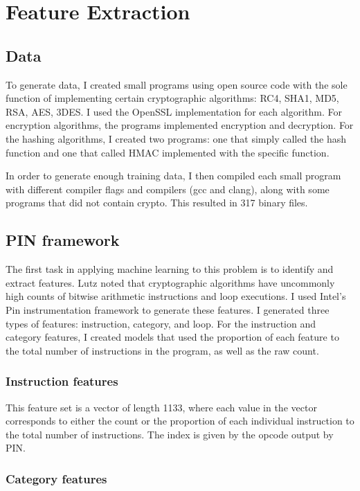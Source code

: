 \chapter{Feature Extraction}

\section{Data}
To generate data, I created small programs using open source code with the sole function of implementing certain cryptographic algorithms: RC4, SHA1, MD5, RSA, AES, 3DES.  I used the OpenSSL implementation for each algorithm.  For encryption algorithms, the programs implemented encryption and decryption.  For the hashing algorithms, I created two programs: one that simply called the hash function and one that called HMAC implemented with the specific function.

In order to generate enough training data, I then compiled each small program with different compiler flags and compilers (gcc and clang), along with some programs that did not contain crypto.  This resulted in 317 binary files.


\section{PIN framework}
The first task in applying machine learning to this problem is to identify and extract features.  Lutz \cite{lutz} noted that cryptographic algorithms have uncommonly high counts of bitwise arithmetic instructions and loop executions.  I used Intel's Pin instrumentation framework \cite{pin} to generate these features.  I generated three types of features: instruction, category, and loop.  For the instruction and category features, I created models that used the proportion of each feature to the total number of instructions in the program, as well as the raw count.

\subsection{Instruction features}
This feature set is a vector of length 1133, where each value in the vector corresponds to either the count or the proportion of each individual instruction to the total number of instructions.  The index is given by the opcode output by PIN.

\subsection{Category features}

